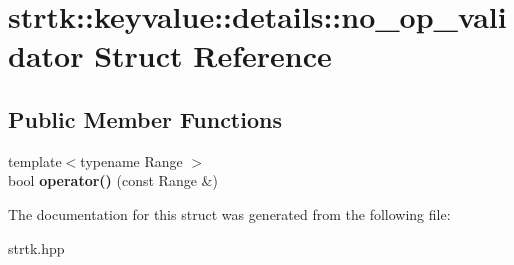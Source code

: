 \hypertarget{structstrtk_1_1keyvalue_1_1details_1_1no__op__validator}{\section{strtk\-:\-:keyvalue\-:\-:details\-:\-:no\-\_\-op\-\_\-validator Struct Reference}
\label{structstrtk_1_1keyvalue_1_1details_1_1no__op__validator}
}
\subsection*{Public Member Functions}
\begin{DoxyCompactItemize}
\item 
\hypertarget{structstrtk_1_1keyvalue_1_1details_1_1no__op__validator_a02484c668dcc580d0edc20a6c0284211}{{\footnotesize template$<$typename Range $>$ }\\bool {\bfseries operator()} (const Range \&)}\label{structstrtk_1_1keyvalue_1_1details_1_1no__op__validator_a02484c668dcc580d0edc20a6c0284211}

\end{DoxyCompactItemize}


The documentation for this struct was generated from the following file\-:\begin{DoxyCompactItemize}
\item 
strtk.\-hpp\end{DoxyCompactItemize}

